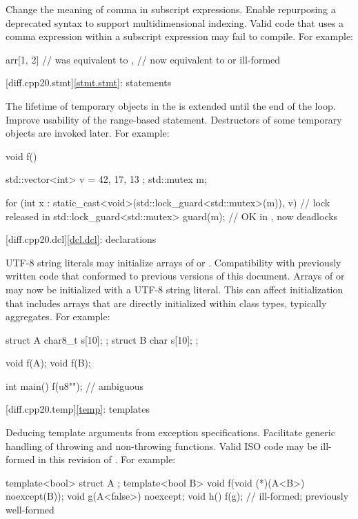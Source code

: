 \change
Change the meaning of comma in subscript expressions.
\rationale
Enable repurposing a deprecated syntax to support multidimensional indexing.
\effect
Valid \CppXX{} code that uses a comma expression within a
subscript expression may fail to compile.
For example:
\begin{codeblock}
arr[1, 2]               // was equivalent to ,
                        // now equivalent to  or ill-formed
\end{codeblock}

[diff.cpp20.stmt]{\ref{stmt.stmt}: statements}

\change
The lifetime of temporary objects in the 
is extended until the end of the loop.
\rationale
Improve usability of the range-based  statement.
\effect
Destructors of some temporary objects are invoked later.
For example:
\begin{codeblock}
void f() {
  std::vector<int> v = { 42, 17, 13 };
  std::mutex m;

  for (int x :
       static_cast<void>(std::lock_guard<std::mutex>(m)), v) {  // lock released in \CppXX
    std::lock_guard<std::mutex> guard(m);                       // OK in \CppXX, now deadlocks
  }
}
\end{codeblock}

[diff.cpp20.dcl]{\ref{dcl.dcl}: declarations}

\change
UTF-8 string literals may initialize arrays of  or
.
\rationale
Compatibility with previously written code that conformed to previous versions of this document.
\effect
Arrays of  or 
may now be initialized with a UTF-8 string literal.
This can affect initialization that includes arrays
that are directly initialized within class types, typically aggregates.
For example:
\begin{codeblock}
struct A {
  char8_t s[10];
};
struct B {
  char s[10];
};

void f(A);
void f(B);

int main() {
  f({u8""});            // ambiguous
}
\end{codeblock}

[diff.cpp20.temp]{\ref{temp}: templates}

\change
Deducing template arguments from exception specifications.
\rationale
Facilitate generic handling of throwing and non-throwing functions.
\effect
Valid ISO \CppXX{} code may be ill-formed in this revision of \Cpp{}.
For example:
\begin{codeblock}
template<bool> struct A { };
template<bool B> void f(void (*)(A<B>) noexcept(B));
void g(A<false>) noexcept;
void h() {
  f(g);                         // ill-formed; previously well-formed
}
\end{codeblock}

